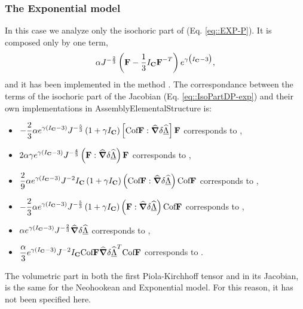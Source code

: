 \subsubsection{The Exponential model}
In this case we analyze only the isochoric part of \Piola (Eq. \eqref{eq::EXP-P}). It is composed only by one term,
\begin{displaymath}
\displaystyle \alpha J^{-\frac{2}{3}}\left(\F-\frac{1}{3}I_{\C}\F^{-T}\right)e^{\gamma\big(I_{\C}-3\big)},
\end{displaymath}
and it has been implemented in the method .
The correspondance between the terms of the isochoric part of the Jacobian (Eq. \eqref{eq::IsoPartDP-exp}) and their own implementations in AssemblyElementalStructure is:
\begin{itemize}
  \item $\displaystyle -\frac{2}{3}\alpha\term J^{-\frac{5}{3}}\left(1+\gamma I_{\C}\right)\left[\cofF:\GradSpost\right]\F$ corresponds to ,
  \item $\displaystyle 2\alpha\gamma\term J ^{-\frac{4}{3}}\left(\F:\GradSpost\right)\F$ corresponds to ,
  \item $\displaystyle \frac{2}{9}\alpha\term J^{-2}I_{\C}\left(1+\gamma I_{\C}\right)\left(\cofF:\GradSpost\right)\cofF$ corresponds to ,
  \item $\displaystyle -\frac{2}{3}\alpha\term J^{-\frac{5}{3}}\left(1+\gamma I_{\C}\right)\left(\F:\GradSpost\right)\cofF$ corresponds to ,
  \item $\displaystyle \alpha\term J^{-\frac{2}{3}}\GradSpost$ corresponds to ,
  \item $\displaystyle \frac{\alpha}{3}\term J^{-2}I_{\C}\cofF\GradSpost^T\cofF$ corresponds to .
\end{itemize}
The volumetric part in both the first Piola-Kirchhoff tensor and in its Jacobian, is the same for the Neohookean and Exponential model. For this reason, it has not been specified here.
